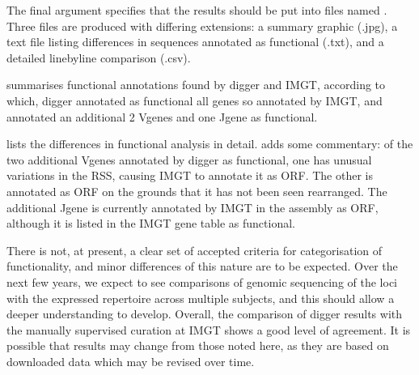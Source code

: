 \documentclass[letterpaper,10pt,english]{sphinxmanual}
\let\sphinxpxdimen\pdfpxdimen\else\newdimen\sphinxpxdimen
\begin{document}
\begin{sphinxVerbatim}[commandchars=\\\{\}]
     
\end{sphinxVerbatim}

\sphinxAtStartPar
The final argument specifies that the results should be put into files named . Three files are produced with differing extensions: a summary graphic (.jpg), a text file listing differences
in sequences annotated as functional (.txt), and a detailed line\sphinxhyphen{}by\sphinxhyphen{}line comparison (.csv).

\sphinxAtStartPar
{} summarises functional annotations found by digger and IMGT, according to which,
digger annotated as functional all genes so annotated by IMGT, and annotated an additional 2 V\sphinxhyphen{}genes and one J\sphinxhyphen{}gene as functional.

\noindent\sphinxincludegraphics[width=600\sphinxpxdimen]{{igh_results}.jpg}

\sphinxAtStartPar
{} lists the differences in functional analysis in detail.
 adds some commentary: of the two additional
V\sphinxhyphen{}genes annotated by digger as functional, one has unusual variations in the RSS, causing IMGT to annotate it as ORF. The other is annotated as ORF on the grounds that it has not been
seen rearranged. The additional J\sphinxhyphen{}gene is currently annotated by IMGT in the assembly as ORF, although it is listed in the IMGT gene table as functional.

\sphinxAtStartPar
There is not, at present, a clear set of accepted criteria for categorisation of functionality, and minor differences of this nature are to be expected. Over the next few years, we expect to see comparisons of genomic
sequencing of the loci with the expressed repertoire across multiple subjects, and this should allow a deeper understanding to develop. Overall, the comparison of digger results with the manually supervised curation
at IMGT shows a good level of agreement. It is possible that results may change from those noted here, as they are based on downloaded data which may be revised over time.
\end{document}
